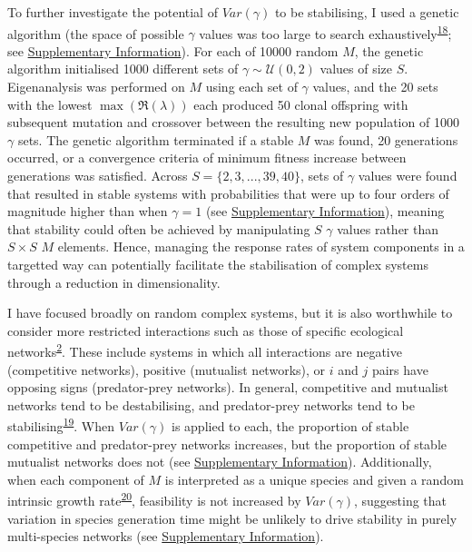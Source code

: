 \documentclass[]{article}
\begin{document}
To further investigate the potential of \(Var(\gamma)\) to be stabilising,
I used a genetic algorithm (the space of possible \(\gamma\)
values was too large to search
exhaustively\textsuperscript{\protect\hyperlink{ref-Hamblin2013}{18}};
see \hyperlink{SIstart}{Supplementary Information}). For each of 10000 
random \(M\), the
genetic algorithm initialised 1000 different sets of
\(\gamma \sim \mathcal{U}(0, 2)\) values of size \(S\). Eigenanalysis was
performed on \(M\) using 
each set of \(\gamma\) values, and the 20 sets with the
lowest \(\max\left(\Re(\lambda)\right)\) each produced 50 clonal offspring with
subsequent mutation and crossover between the resulting new population
of 1000 \(\gamma\) sets. The genetic algorithm terminated if a stable
\(M\) was found, 20 generations occurred, or a convergence criteria of
minimum fitness increase between generations was satisfied. Across
\(S = \{2, 3, ..., 39, 40\}\), sets of \(\gamma\) values were found that
resulted in stable systems with probabilities that were up to four orders of
magnitude higher than when \(\gamma = 1\) (see \hyperlink{SIstart}{Supplementary
Information}), meaning that stability could often be achieved by 
manipulating \(S\) \(\gamma\) values rather than \(S \times S\) \(M\) elements.
Hence, managing the response rates of system components in a targetted
way can potentially facilitate the stabilisation of complex systems 
through a reduction in dimensionality.

I have focused broadly on random complex systems, but it is also
worthwhile to consider more restricted interactions such as those of
specific ecological
networks\textsuperscript{\protect\hyperlink{ref-Allesina2012}{2}}. These
include systems in which all interactions are negative (competitive networks), positive (mutualist networks), or \(i\) and
\(j\) pairs have opposing signs (predator-prey networks). In
general, competitive and mutualist networks tend to be destabilising,
and predator-prey networks tend to be
stabilising\textsuperscript{\protect\hyperlink{ref-Allesina2011}{19}}.
When \(Var(\gamma)\) is applied to each, the proportion of stable
competitive and predator-prey networks increases, but the proportion of
stable mutualist networks does not (see 
\hyperlink{SIstart}{Supplementary Information}).
Additionally, when each component of \(M\) is interpreted as a unique
species and given a random intrinsic growth
rate\textsuperscript{\protect\hyperlink{ref-Dougoud2018}{20}},
feasibility is not increased by \(Var(\gamma)\), suggesting that
variation in species generation time might be unlikely to drive
stability in purely multi-species networks (see \hyperlink{SIstart}{Supplementary
Information}).
\end{document}
